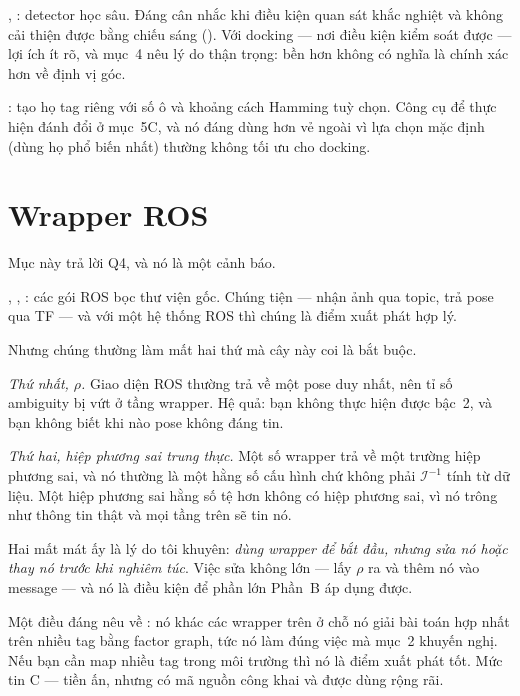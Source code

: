 \documentclass[../../marker.tex]{subfiles}
\begin{document}
 \cite{zhang2023deeptag},  \cite{berral2023deeparuco}: detector học sâu. Đáng cân nhắc khi điều kiện quan sát khắc nghiệt và không cải thiện được bằng chiếu sáng (). Với docking --- nơi điều kiện kiểm soát được --- lợi ích ít rõ, và  mục~4 nêu lý do thận trọng: bền hơn không có nghĩa là chính xác hơn về định vị góc.

: tạo họ tag riêng với số ô và khoảng cách Hamming tuỳ chọn. Công cụ để thực hiện đánh đổi ở  mục~5C, và nó đáng dùng hơn vẻ ngoài vì lựa chọn mặc định (dùng họ phổ biến nhất) thường không tối ưu cho docking.

\section{Wrapper ROS}

Mục này trả lời Q4, và nó là một cảnh báo.

, , : các gói ROS bọc thư viện gốc. Chúng tiện --- nhận ảnh qua topic, trả pose qua TF --- và với một hệ thống ROS thì chúng là điểm xuất phát hợp lý.

Nhưng chúng thường làm mất hai thứ mà cây này coi là bắt buộc.

\emph{Thứ nhất, \(\rho\).} Giao diện ROS thường trả về một pose duy nhất, nên tỉ số ambiguity bị vứt ở tầng wrapper. Hệ quả: bạn không thực hiện được  bậc~2, và bạn không biết khi nào pose không đáng tin.

\emph{Thứ hai, hiệp phương sai trung thực.} Một số wrapper trả về một trường hiệp phương sai, và nó thường là một hằng số cấu hình chứ không phải \(\mathcal{I}^{-1}\) tính từ dữ liệu. Một hiệp phương sai hằng số tệ hơn không có hiệp phương sai, vì nó trông như thông tin thật và mọi tầng trên sẽ tin nó.

Hai mất mát ấy là lý do tôi khuyên: \emph{dùng wrapper để bắt đầu, nhưng sửa nó hoặc thay nó trước khi nghiêm túc}. Việc sửa không lớn --- lấy \(\rho\) ra và thêm nó vào message --- và nó là điều kiện để phần lớn Phần~B áp dụng được.

Một điều đáng nêu về  \cite{pfrommer2019tagslam}: nó khác các wrapper trên ở chỗ nó giải bài toán hợp nhất trên nhiều tag bằng factor graph, tức nó làm đúng việc mà  mục~2 khuyến nghị. Nếu bạn cần map nhiều tag trong môi trường thì nó là điểm xuất phát tốt. Mức tin C --- tiền ấn, nhưng có mã nguồn công khai và được dùng rộng rãi.
\end{document}
